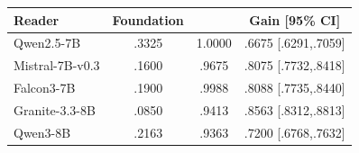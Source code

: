 \begin{tabular}{lccc}
\toprule
Reader & Foundation & \ascent{} & Gain [95\% CI] \\
\midrule
Qwen2.5-7B & .3325 & 1.0000 & .6675 [.6291,.7059] \\
Mistral-7B-v0.3 & .1600 & .9675 & .8075 [.7732,.8418] \\
Falcon3-7B & .1900 & .9988 & .8088 [.7735,.8440] \\
Granite-3.3-8B & .0850 & .9413 & .8563 [.8312,.8813] \\
Qwen3-8B & .2163 & .9363 & .7200 [.6768,.7632] \\
\bottomrule
\end{tabular}
